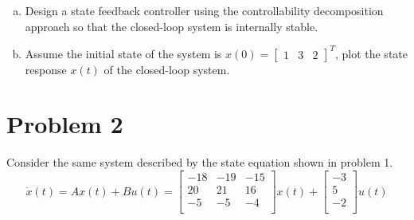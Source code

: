 \documentclass{article}
\begin{document}
\begin{enumerate}[(a)]
\item Design a state feedback controller using the controllability decomposition approach so that the closed-loop system is internally stable.
\newline
\newline

\item Assume the initial state of the system is $x(0) = \begin{bmatrix} 1 & 3 & 2\end{bmatrix}^T$, plot the state response $x(t)$ of the closed-loop system.
\newline
\newline

\end{enumerate}

\section*{Problem 2}
Consider the same system described by the state equation shown in problem 1.
$$
\dot{x}(t) = Ax(t) + Bu(t) =
\begin{bmatrix}
-18 & -19 & -15 \\
20 & 21 & 16 \\
-5 & -5 & -4 \\
\end{bmatrix}
x(t)
+
\begin{bmatrix}
-3 \\
 5 \\ 
-2 \\
\end{bmatrix}
u(t)
$$
\end{document}
